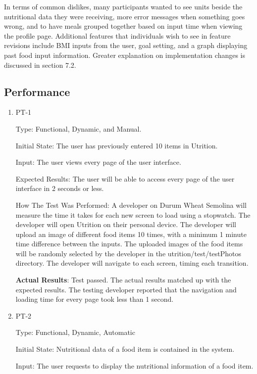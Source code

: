 \documentclass[12pt, titlepage]{article}
\begin{document}
	In terms of common dislikes, many participants wanted to see units beside the nutritional data they were receiving, more error messages when something goes wrong, and to have meals grouped together based on input time when viewing the profile page. Additional features that individuals wish to see in feature revisions include BMI inputs from the user, goal setting, and a graph displaying past food input information. Greater explanation on implementation changes is discussed in section 7.2.
	
	\subsection{Performance}
	
	\begin{enumerate}
		
		\item{PT-1} 
		
		Type: Functional, Dynamic, and Manual.
		
		Initial State: The user has previously entered 10 items in Utrition.
		
		Input: The user views every page of the user interface.
		
		Expected Results: The user will be able to access every page of the user interface in 2 seconds or less.
		
		How The Test Was Performed: A developer on Durum Wheat Semolina will measure the time it takes for each new screen to load using a stopwatch. The developer will open Utrition on their personal device. The developer will upload an image of different food items 10 times, with a minimum 1 minute time difference between the inputs. The uploaded images of the food items will be randomly selected by the developer in the utrition/test/testPhotos directory. The developer will navigate to each screen, timing each transition.
		
		\textbf{Actual Results}: Test passed. The actual results matched up with the expected results. The testing developer reported that the navigation and loading time for every page took less than 1 second.
		
		\item{PT-2}
		
		Type: Functional, Dynamic, Automatic
		
		Initial State: Nutritional data of a food item is contained in the 
		system.
		
		Input: The user requests to display the nutritional information of a 
		food item.
		

\end{enumerate}
\end{document}
